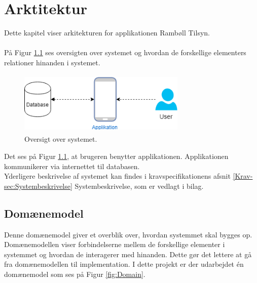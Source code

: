 \chapter{Arktitektur}
Dette kapitel viser arkitekturen for applikationen Rambøll Tilsyn.\label{sec:Arkitektur} \\ \\ 
På Figur \ref{fig:OversigtSystembeskrivelse} ses oversigten over systemet og hvordan de forskellige elementers relationer hinanden i systemet.
\begin{figure}[H] %
	\centering
	\includegraphics[height=3cm, width=8cm]{../ArkitekturDesign/OverordnetArkitektur//Oversigtoversystem}
	\caption{Oversigt over systemet.}
	\label{fig:OversigtSystembeskrivelse}
\end{figure}
Det ses på Figur \ref{fig:OversigtSystembeskrivelse}, at brugeren benytter applikationen. Applikationen kommunikerer via internettet til databasen. \\
Yderligere beskrivelse af systemet kan findes i kravspecifikationens afsnit \ref{Krav-sec:Systembeskrivelse} Systembeskrivelse, som er vedlagt i bilag.

\clearpage

\section{Domænemodel}
Denne domænemodel giver et overblik over, hvordan systemmet skal bygges op. Domænemodellen viser forbindelserne mellem de forskellige elementer i systemmet og hvordan de interagerer med hinanden. Dette gør det lettere at gå fra domænemodellen til implementation.
I dette projekt er der udarbejdet én domænemodel som ses på Figur \ref{fig:Domain}.

